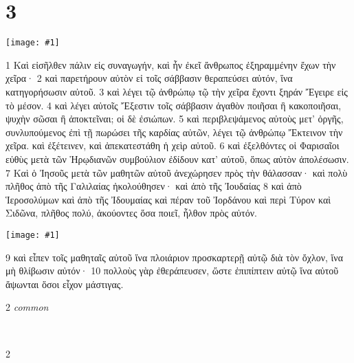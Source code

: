 \documentclass[10pt,a5paper,twoside,twocolumn]{book}
\newcommand{\fig}[1]{\texttt{[image: \#1]}\label{fig:#1}}
\newcommand*\cleartoleftpage{%
  \ifodd\value{page}\hbox{}\clearpage\fi
}
\newcommand{\separator}{\hspace{0.27\textwidth}\noindent\makebox[\linewidth]{\resizebox{0.3333\linewidth}{1pt}{$\bullet$}}\bigskip}
\newenvironment{facing}{\cleartoleftpage}{\clearpage\pagebreak}
\newenvironment{help}{\clearpage}{}
\newenvironment{helpsec}{\begin{minipage}[t]{\textwidth}\begin{multicols}{2}}{\end{multicols}\end{minipage}}
\newenvironment{vocab}{\begin{helpsec}}{\end{helpsec}}
\newenvironment{translation}{\separator\\\begin{helpsec}\footnotesize}{\end{helpsec}}
\begin{document}

\chapter{3}

\begin{facing}

\fig{03-01} %

1 Καὶ εἰσῆλθεν πάλιν εἰς συναγωγήν, καὶ ἦν ἐκεῖ ἄνθρωπος ἐξηραμμένην ἔχων τὴν χεῖρα· 2 καὶ παρετήρουν αὐτὸν εἰ τοῖς σάββασιν θεραπεύσει αὐτόν, ἵνα κατηγορήσωσιν αὐτοῦ. 3 καὶ λέγει τῷ ἀνθρώπῳ τῷ τὴν χεῖρα ἔχοντι ξηράν Ἔγειρε εἰς τὸ μέσον. 4 καὶ λέγει αὐτοῖς Ἔξεστιν τοῖς σάββασιν ἀγαθὸν ποιῆσαι ἢ κακοποιῆσαι, ψυχὴν σῶσαι ἢ ἀποκτεῖναι; οἱ δὲ ἐσιώπων. 5 καὶ περιβλεψάμενος αὐτοὺς μετ’ ὀργῆς, συνλυπούμενος ἐπὶ τῇ πωρώσει τῆς καρδίας αὐτῶν, λέγει τῷ ἀνθρώπῳ Ἔκτεινον τὴν χεῖρα. καὶ ἐξέτεινεν, καὶ ἀπεκατεστάθη ἡ χεὶρ αὐτοῦ. 6 καὶ ἐξελθόντες οἱ Φαρισαῖοι εὐθὺς μετὰ τῶν Ἡρῳδιανῶν συμβούλιον ἐδίδουν κατ’ αὐτοῦ, ὅπως αὐτὸν ἀπολέσωσιν. 	7 Καὶ ὁ Ἰησοῦς μετὰ τῶν μαθητῶν αὐτοῦ ἀνεχώρησεν πρὸς τὴν θάλασσαν· καὶ πολὺ πλῆθος ἀπὸ τῆς Γαλιλαίας ἠκολούθησεν· καὶ ἀπὸ τῆς Ἰουδαίας 8 καὶ ἀπὸ Ἱεροσολύμων καὶ ἀπὸ τῆς Ἰδουμαίας καὶ πέραν τοῦ Ἰορδάνου καὶ περὶ Τύρον καὶ Σιδῶνα, πλῆθος πολύ, ἀκούοντες ὅσα ποιεῖ, ἦλθον πρὸς αὐτόν. 

\fig{03-09} %

9 καὶ εἶπεν τοῖς μαθηταῖς αὐτοῦ ἵνα πλοιάριον προσκαρτερῇ αὐτῷ διὰ τὸν ὄχλον, ἵνα μὴ θλίβωσιν αὐτόν· 10 πολλοὺς γὰρ ἐθεράπευσεν, ὥστε ἐπιπίπτειν αὐτῷ ἵνα αὐτοῦ ἅψωνται ὅσοι εἶχον μάστιγας. 

\begin{help}
\begin{vocab}
\emph{common}\\

\end{vocab}
\begin{translation}

\end{translation}
\end{help}
\end{facing}
\end{document}
